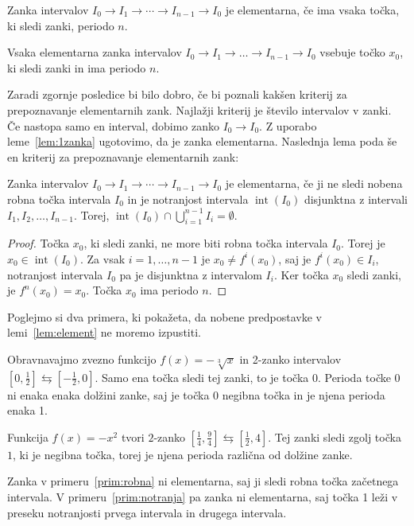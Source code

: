 \documentclass[mat2]{fmfdelo}
\DeclareMathOperator{\interior}{int}
\begin{document}
\begin{definicija}\label{def:element}
Zanka intervalov $I_0 \to I_1 \to \cdots \to I_{n-1} \to I_0$ je elementarna, če ima vsaka točka, ki sledi zanki, periodo $n$.
\end{definicija}

\begin{posledica}
Vsaka elementarna zanka intervalov $I_0 \to I_1 \to \dots \to I_{n-1} \to I_0$ vsebuje točko $x_0$, ki sledi zanki in ima periodo $n$.
\end{posledica}

Zaradi zgornje posledice bi bilo dobro, če bi poznali kakšen kriterij za prepoznavanje elementarnih zank. Najlažji kriterij je število intervalov v zanki. Če nastopa samo en interval, dobimo zanko $I_0 \to I_0$. Z uporabo leme~\ref{lem:1zanka} ugotovimo, da je zanka elementarna. Naslednja lema poda še en kriterij za prepoznavanje elementarnih zank:

\begin{lema}\label{lem:element}
Zanka intervalov $I_0 \to I_1 \to \cdots \to I_{n-1} \to I_0$ je elementarna, če ji ne sledi nobena robna točka intervala $I_0$ in je notranjost intervala $\interior(I_0)$ disjunktna z intervali $I_1, I_2,  \dots, I_{n-1}$. Torej, $\interior(I_0) \cap \bigcup_{i=1}^{n-1}I_i = \emptyset$.
\end{lema}
\begin{proof}
Točka $x_0$, ki sledi zanki, ne more biti robna točka intervala $I_0$. Torej je $x_0 \in \interior(I_0)$. Za vsak $i=1, \dots, n-1$ je $x_0 \neq f^i(x_0)$, saj je $f^i(x_0) \in I_i$, notranjost intervala $I_0$ pa je disjunktna z intervalom $I_i$. Ker točka $x_0$ sledi zanki, je $f^n(x_0)=x_0$. Točka $x_0$ ima periodo $n$.
\end{proof}

Poglejmo si dva primera, ki pokažeta, da nobene predpostavke v lemi~\ref{lem:element} ne moremo izpustiti.

\begin{primer}\label{prim:robna}
Obravnavajmo zvezno funkcijo $f(x) = -\sqrt[3]{x}$ in 2-zanko intervalov $\left[0, \frac{1}{2}\right] \leftrightarrows \left[-\frac{1}{2}, 0\right]$. Samo ena točka sledi tej zanki, to je točka 0. Perioda točke 0 ni enaka enaka dolžini zanke, saj je točka 0 negibna točka in je njena perioda enaka 1.
\end{primer}
\begin{primer}\label{prim:notranja}
Funkcija $f(x) = - x^2$ tvori $2$-zanko $\left[\frac{1}{4}, \frac{9}{4}\right] \leftrightarrows \left[\frac{1}{2}, 4\right]$. Tej zanki sledi zgolj točka $1$, ki je negibna točka, torej je njena perioda različna od dolžine zanke.
\end{primer}
Zanka v primeru~\ref{prim:robna} ni elementarna, saj ji sledi robna točka začetnega intervala. V primeru~\ref{prim:notranja} pa zanka ni elementarna, saj točka 1 leži v preseku notranjosti prvega intervala in drugega intervala. 
\end{document}
